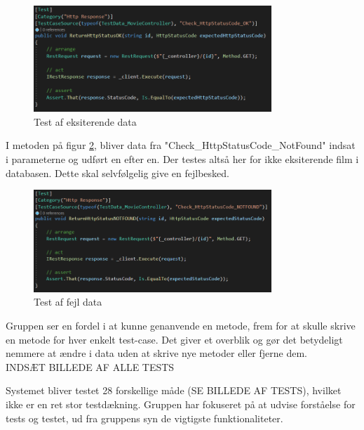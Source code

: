 \begin{figure}[H]
    \centering
    \includegraphics[width=0.8\textwidth]{figures/testmoviestatusok.PNG}
    \caption{Test af eksiterende data}
    \label{fig:testeks}
\end{figure}

I metoden på figur \ref{fig:testeks2}, bliver data fra "Check\_HttpStatusCode\_NotFound" indsat i parameterne
og udført en efter en. Der testes altså her for ikke eksiterende film i databasen. Dette skal selvfølgelig
give en fejlbesked.  

\begin{figure}[H]
    \centering
    \includegraphics[width=0.8\textwidth]{figures/testmoviestatusnotfound.PNG}
    \caption{Test af fejl data}
    \label{fig:testeks2}
\end{figure}

Gruppen ser en fordel i at kunne genanvende en metode, 
frem for at skulle skrive en metode for hver enkelt test-case. 
Det giver et overblik og gør det betydeligt nemmere at ændre i data uden at skrive nye metoder eller fjerne dem.\\

INDSÆT BILLEDE AF ALLE TESTS

Systemet bliver testet 28 forskellige måde (SE BILLEDE AF TESTS), hvilket ikke er en ret stor testdækning. 
Gruppen har fokuseret på at udvise forståelse for tests og testet, ud fra gruppens syn de vigtigste funktionaliteter.    